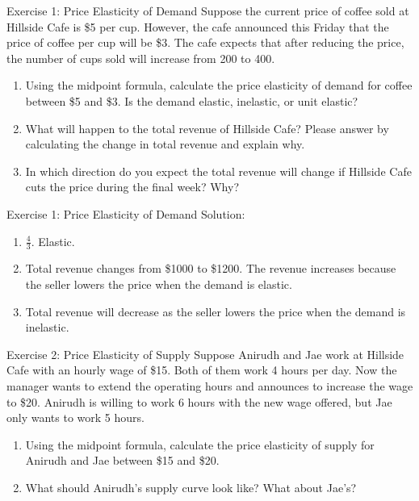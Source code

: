 \documentclass[9pt, handout]{beamer}
\begin{document}
\begin{frame}{Exercise 1: Price Elasticity of Demand}
    Suppose the current price of coffee sold at Hillside Cafe is \$5 per cup. However, the cafe announced this Friday that the price of coffee per cup will be \$3. The cafe expects that after reducing the price, the number of cups sold will increase from 200 to 400. 
    \begin{enumerate}
        \item Using the midpoint formula, calculate the price elasticity of demand for coffee between \$5 and \$3. Is the demand elastic, inelastic, or unit elastic?
        \item What will happen to the total revenue of Hillside Cafe? Please answer by calculating the change in total revenue and explain why.
        \item In which direction do you expect the total revenue will change if Hillside Cafe cuts the price during the final week? Why? 
    \end{enumerate}
    \vspace{1.5in}
\end{frame}

\begin{frame}{Exercise 1: Price Elasticity of Demand}
    Solution: 
    \begin{enumerate}
        \item $\frac{4}{3}$. Elastic.  
        \item Total revenue changes from \$1000 to \$1200. The revenue increases because the seller lowers the price when the demand is elastic. 
        \item Total revenue will decrease as the seller lowers the price when the demand is inelastic. 
    \end{enumerate}
\end{frame}


\begin{frame}{Exercise 2: Price Elasticity of Supply}
    Suppose Anirudh and Jae work at Hillside Cafe with an hourly wage of \$15. Both of them work 4 hours per day. Now the manager wants to extend the operating hours and announces to increase the wage to \$20. Anirudh is willing to work 6 hours with the new wage offered, but Jae only wants to work 5 hours. 
    \begin{enumerate}
        \item Using the midpoint formula, calculate the price elasticity of supply for Anirudh and Jae between \$15 and \$20.  
        \item What should Anirudh's supply curve look like? What about Jae's?  
    \end{enumerate}
    \vspace{1.5in}
\end{frame}
\end{document}
